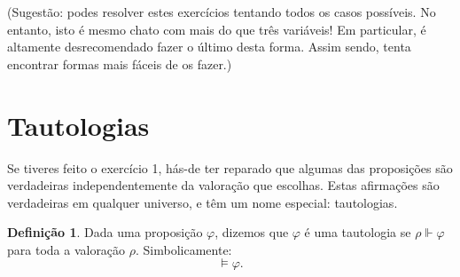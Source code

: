 \documentclass{article}
\theoremstyle{definition}
\newtheorem{definicao}{Definição}
\theoremstyle{remark}
\begin{document}
	(Sugestão: podes resolver estes exercícios tentando todos os casos possíveis. No entanto, isto é mesmo chato com mais do que três variáveis! Em particular, é altamente desrecomendado fazer o último desta forma. Assim sendo, tenta encontrar formas mais fáceis de os fazer.)
	
	\section{Tautologias}
	
	Se tiveres feito o exercício 1, hás-de ter reparado que algumas das proposições são verdadeiras independentemente da valoração que escolhas. Estas afirmações são verdadeiras em qualquer universo, e têm um nome especial: tautologias.
	
	\begin{definicao}
	Dada uma proposição $\varphi$, dizemos que $\varphi$ é uma tautologia se $\rho \Vdash \varphi$ para toda a valoração $\rho$. Simbolicamente:
	\[\vDash \varphi.\]
	\end{definicao}
\end{document}
